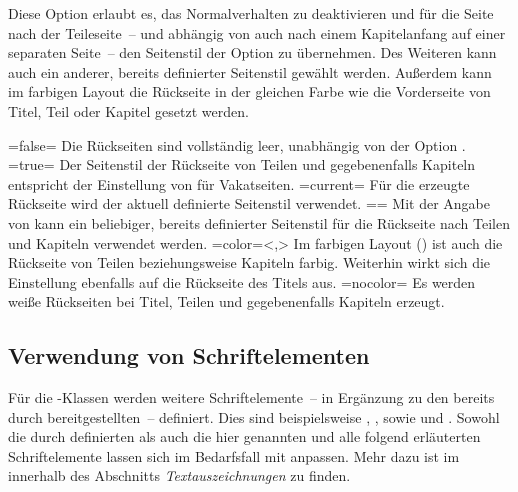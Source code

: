 \begin{DeclareEntity*}{}
\begin{DeclareEntity*}{}
\begin{DeclareEntity*}{}
\begin{Declaration}
Diese Option erlaubt es, das Normalverhalten zu deaktivieren und für die Seite 
nach der Teileseite~-- und abhängig von  auch nach einem 
Kapitelanfang auf einer separaten Seite~-- den Seitenstil der Option 
 zu übernehmen. Des Weiteren kann auch ein anderer, 
bereits definierter Seitenstil gewählt werden. Außerdem kann im farbigen Layout 
die Rückseite in der gleichen Farbe wie die Vorderseite von Titel, Teil oder 
Kapitel gesetzt werden. \notudscrartcl
\begin{DeclareValues}
\itemval=false=
  Die Rückseiten sind vollständig leer, unabhängig von der Option
  .
\itemval*=true=
  Der Seitenstil der Rückseite von Teilen und gegebenenfalls Kapiteln entspricht
  der Einstellung von  für Vakatseiten.
\itemval=current=
  Für die erzeugte Rückseite wird der aktuell definierte Seitenstil verwendet.
\itemval==
  Mit der Angabe von  
  kann ein beliebiger, bereits definierter Seitenstil für die Rückseite nach 
  Teilen und Kapiteln verwendet werden.
\itemval=color=<,>
  Im farbigen Layout () ist auch die 
  Rückseite von Teilen beziehungsweise Kapiteln farbig. Weiterhin wirkt sich 
  die Einstellung ebenfalls auf die Rückseite des Titels aus.
\itemval=nocolor=
  Es werden weiße Rückseiten bei Titel, Teilen und gegebenenfalls Kapiteln 
  erzeugt.
\end{DeclareValues}
%
\end{Declaration}



\subsection{%
  Verwendung von Schriftelementen%
  \label{sec:fonts:elements}%
}
%
Für die \TUDScript-Klassen werden weitere Schriftelemente~-- in Ergänzung zu 
den bereits durch \KOMAScript bereitgestellten~-- definiert. Dies sind 
beispielsweise , ,  sowie 
 und . Sowohl die durch \KOMAScript 
definierten als auch die hier genannten und alle folgend erläuterten 
Schriftelemente lassen sich im Bedarfsfall mit 
 anpassen. 
Mehr dazu ist im \scrguide innerhalb des Abschnitts \emph{Textauszeichnungen} 
zu finden.


\end{DeclareEntity*}
\end{DeclareEntity*}
\end{DeclareEntity*}
